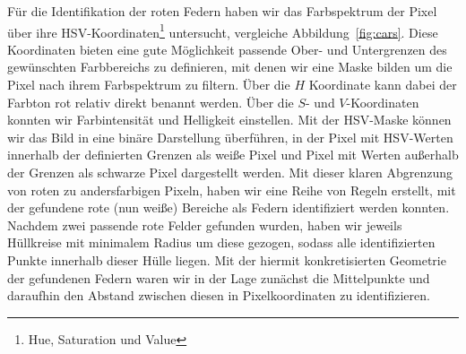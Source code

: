 \documentclass[10pt]{article}
\begin{document}
    Für die Identifikation der roten Federn haben wir das Farbspektrum der Pixel über ihre HSV-Koordinaten\footnote{Hue, Saturation und Value} untersucht, vergleiche Abbildung~\ref{fig:cars}.  
    Diese Koordinaten bieten eine gute Möglichkeit passende Ober- und Untergrenzen des gewünschten Farbbereichs zu definieren, mit denen wir eine Maske bilden um die Pixel nach ihrem Farbspektrum zu filtern.
    Über die $H$ Koordinate kann dabei der Farbton rot relativ direkt benannt werden.
    Über die $S$- und $V$-Koordinaten konnten wir Farbintensität und Helligkeit einstellen.
    Mit der HSV-Maske können wir das Bild in eine binäre Darstellung überführen, in der Pixel mit HSV-Werten innerhalb der definierten Grenzen als weiße Pixel und Pixel mit Werten außerhalb der Grenzen als schwarze Pixel dargestellt werden.
    Mit dieser klaren Abgrenzung von roten zu andersfarbigen Pixeln, haben wir eine Reihe von Regeln erstellt, mit der gefundene rote (nun weiße) Bereiche als Federn identifiziert werden konnten.
    Nachdem zwei passende rote Felder gefunden wurden, haben wir jeweils Hüllkreise mit minimalem Radius um diese gezogen, sodass alle identifizierten Punkte innerhalb dieser Hülle liegen.
    Mit der hiermit konkretisierten Geometrie der gefundenen Federn waren wir in der Lage zunächst die Mittelpunkte und daraufhin den Abstand zwischen diesen in Pixelkoordinaten zu identifizieren.
\end{document}
